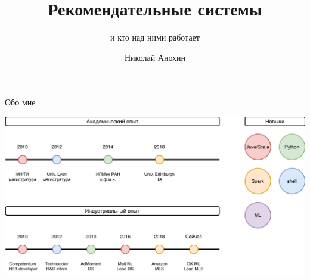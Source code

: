 \documentclass[11pt,aspectratio=169,handout]{beamer}
\author{Николай Анохин}
\title{Рекомендательные системы}
\subtitle{и кто над ними работает}
\begin{document}
{
\begin{frame}[plain]
\end{frame}
}

\begin{frame}{Обо мне}

\begin{center}
\includegraphics[scale=0.23]{images/about-me.png}
\end{center}

\end{frame}
\end{document}
